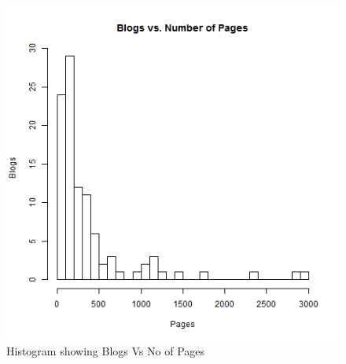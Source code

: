 \begin{figure}[ht]    
    \begin{center}
        \includegraphics[scale=0.60]{questions/q1/R/q1-histogram1.png}
        \caption{Histogram showing Blogs Vs No of Pages}
        \label{Histogram 1}
    \end{center}
\end{figure}

\newpage